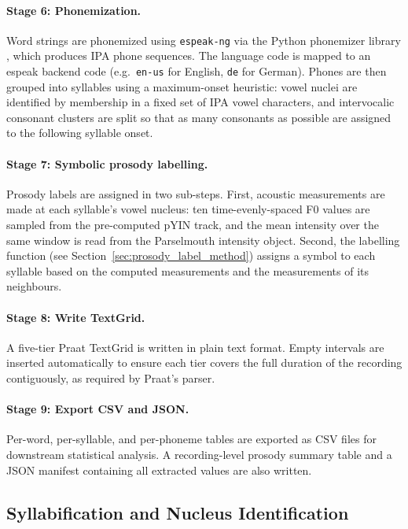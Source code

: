 \paragraph{Stage 6: Phonemization.}
Word strings are phonemized using \texttt{espeak-ng} via the Python phonemizer
library \cite{barnard2021phonemizer}, which produces IPA phone sequences. The
language code is mapped to an espeak backend code (e.g.\ \texttt{en-us} for
English, \texttt{de} for German). Phones are then grouped into syllables using a
maximum-onset heuristic: vowel nuclei are identified by membership in a fixed set
of IPA vowel characters, and intervocalic consonant clusters are split so that as
many consonants as possible are assigned to the following syllable onset.

\paragraph{Stage 7: Symbolic prosody labelling.}
Prosody labels are assigned in two sub-steps. First, acoustic measurements are
made at each syllable's vowel nucleus: ten time-evenly-spaced F0 values are
sampled from the pre-computed pYIN track, and the mean intensity over the same
window is read from the Parselmouth intensity object. Second, the labelling
function (see Section~\ref{sec:prosody_label_method}) assigns a symbol to each
syllable based on the computed measurements and the measurements of its
neighbours.

\paragraph{Stage 8: Write TextGrid.}
A five-tier Praat TextGrid is written in plain text format. Empty intervals are
inserted automatically to ensure each tier covers the full duration of the
recording contiguously, as required by Praat's parser.

\paragraph{Stage 9: Export CSV and JSON.}
Per-word, per-syllable, and per-phoneme tables are exported as CSV files for
downstream statistical analysis. A recording-level prosody summary table and a
JSON manifest containing all extracted values are also written.

\subsection{Syllabification and Nucleus Identification}
\label{sec:syllabification}

